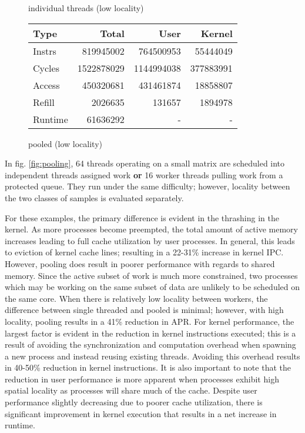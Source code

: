 \documentclass[11pt]{article}
\begin{document}
\begin{figure*}[!h]
\begin{subtable}{.48\textwidth}
		\caption{individual threads (low locality)}
	\end{subtable}
	\hfill
	\begin{subtable}{.48\textwidth} 
		\centering
		\begin{tabular}{ l|rrr }
			Type    & Total      & User       & Kernel    \\
			\hline
			Instrs & 819945002 & 764500953 & 55444049 \\ 
			Cycles & 1522878029 & 1144994038 & 377883991 \\ 
			Access & 450320681 & 431461874 & 18858807 \\ 
			Refill & 2026635 & 131657 & 1894978 \\ 
			Runtime & 61636292 & - & - \\
			\hline
		\end{tabular}
		\caption{pooled (low locality)}
		\label{fig:test}
	\end{subtable}
\end{figure*}

In fig. \ref{fig:pooling}, 64 threads operating on a small matrix are scheduled into independent threads assigned work \textbf{or} 16 worker threads pulling work from a protected queue.  They run under the same difficulty; however, locality between the two classes of samples is evaluated separately.

For these examples, the primary difference is evident in the thrashing in the kernel.  As more processes become preempted, the total amount of active memory increases leading to full cache utilization by user processes.  In general, this leads to eviction of kernel cache lines; resulting in a 22-31\% increase in kernel IPC.  However, pooling does result in poorer performance with regards to shared memory.  Since the active subset of work is much more constrained, two processes which may be working on the same subset of data are unlikely to be scheduled on the same core.  When there is relatively low locality between workers, the difference between single threaded and pooled is minimal; however, with high locality, pooling results in a 41\% reduction in APR.  For kernel performance, the largest factor is evident in the reduction in kernel instructions executed; this is a result of avoiding the synchronization and computation overhead when spawning a new process and instead reusing existing threads. Avoiding this overhead results in 40-50\% reduction in kernel instructions.  It is also important to note that the reduction in user performance is more apparent when processes exhibit high spatial locality as processes will share much of the cache.  Despite user performance slightly decreasing due to poorer cache utilization, there is significant improvement in kernel execution that results in a net increase in runtime.  
\end{document}
